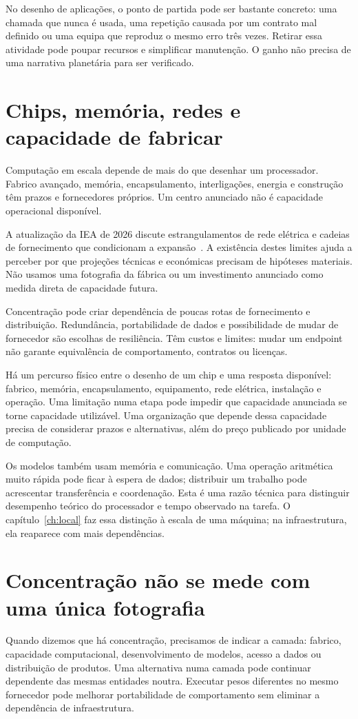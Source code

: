 No desenho de aplicações, o ponto de partida pode ser bastante concreto: uma chamada que nunca é usada, uma repetição causada por um contrato mal definido ou uma equipa que reproduz o mesmo erro três vezes. Retirar essa atividade pode poupar recursos e simplificar manutenção. O ganho não precisa de uma narrativa planetária para ser verificado.

\section{Chips, memória, redes e capacidade de fabricar}
Computação em escala depende de mais do que desenhar um processador. Fabrico avançado, memória, encapsulamento, interligações, energia e construção têm prazos e fornecedores próprios. Um centro anunciado não é capacidade operacional disponível.

A atualização da IEA de 2026 discute estrangulamentos de rede elétrica e cadeias de fornecimento que condicionam a expansão~\citep{iea2026}. A existência destes limites ajuda a perceber por que projeções técnicas e económicas precisam de hipóteses materiais. Não usamos uma fotografia da fábrica ou um investimento anunciado como medida direta de capacidade futura.

Concentração pode criar dependência de poucas rotas de fornecimento e distribuição. Redundância, portabilidade de dados e possibilidade de mudar de fornecedor são escolhas de resiliência. Têm custos e limites: mudar um endpoint não garante equivalência de comportamento, contratos ou licenças.

Há um percurso físico entre o desenho de um chip e uma resposta disponível: fabrico, memória, encapsulamento, equipamento, rede elétrica, instalação e operação. Uma limitação numa etapa pode impedir que capacidade anunciada se torne capacidade utilizável. Uma organização que depende dessa capacidade precisa de considerar prazos e alternativas, além do preço publicado por unidade de computação.

Os modelos também usam memória e comunicação. Uma operação aritmética muito rápida pode ficar à espera de dados; distribuir um trabalho pode acrescentar transferência e coordenação. Esta é uma razão técnica para distinguir desempenho teórico do processador e tempo observado na tarefa. O capítulo~\ref{ch:local} faz essa distinção à escala de uma máquina; na infraestrutura, ela reaparece com mais dependências.

\section{Concentração não se mede com uma única fotografia}
Quando dizemos que há concentração, precisamos de indicar a camada: fabrico, capacidade computacional, desenvolvimento de modelos, acesso a dados ou distribuição de produtos. Uma alternativa numa camada pode continuar dependente das mesmas entidades noutra. Executar pesos diferentes no mesmo fornecedor pode melhorar portabilidade de comportamento sem eliminar a dependência de infraestrutura.

